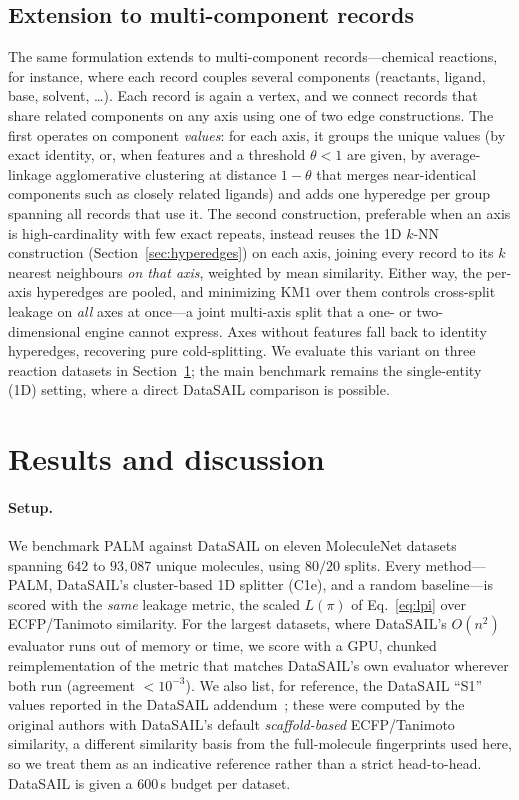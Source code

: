 \documentclass{article}
\begin{document}
\subsection{Extension to multi-component records}
\label{sec:nd}
The same formulation extends to multi-component records---chemical reactions, for
instance, where each record couples several components (reactants, ligand, base,
solvent, \dots). Each record is again a vertex, and we connect records that share
related components on any axis using one of two edge constructions. The first
operates on component \emph{values}: for each axis, it groups the unique values
(by exact identity, or, when features and a threshold $\theta<1$ are given, by
average-linkage agglomerative clustering at distance $1-\theta$ that merges
near-identical components such as closely related ligands) and adds one hyperedge
per group spanning all records that use it. The second construction, preferable
when an axis is high-cardinality with few exact repeats, instead reuses the 1D
$k$-NN construction (Section~\ref{sec:hyperedges}) on each axis, joining every
record to its $k$ nearest neighbours \emph{on that axis}, weighted by mean
similarity. Either way, the per-axis hyperedges are pooled, and minimizing
$\mathrm{KM1}$ over them controls cross-split leakage on \emph{all} axes at
once---a joint multi-axis split that a one- or two-dimensional engine cannot
express. Axes without features fall back to identity hyperedges, recovering pure
cold-splitting. We evaluate this variant on three reaction datasets in
Section~\ref{results}; the main benchmark remains the single-entity (1D) setting,
where a direct DataSAIL comparison is possible.

\section{Results and discussion}
\label{results}

\paragraph{Setup.} We benchmark PALM against DataSAIL on eleven MoleculeNet
datasets \cite{wu2018moleculenet} spanning $642$ to $93{,}087$ unique molecules,
using $80/20$ splits. Every method---PALM, DataSAIL's cluster-based 1D splitter
(C1e), and a random baseline---is scored with the \emph{same} leakage metric,
the scaled $L(\pi)$ of Eq.~\eqref{eq:lpi} over ECFP/Tanimoto similarity. For the
largest datasets, where DataSAIL's $O(n^2)$ evaluator runs out of memory or time,
we score with a GPU, chunked reimplementation of the metric that matches
DataSAIL's own evaluator wherever both run (agreement $<10^{-3}$). We also list,
for reference, the DataSAIL ``S1'' values reported in the DataSAIL
addendum~\cite{joeres2025addendum}; these were computed by the original authors
with DataSAIL's default \emph{scaffold-based} ECFP/Tanimoto similarity, a
different similarity basis from the full-molecule fingerprints used here, so we
treat them as an indicative reference rather than a strict head-to-head. DataSAIL
is given a $600$\,s budget per dataset.
\end{document}
